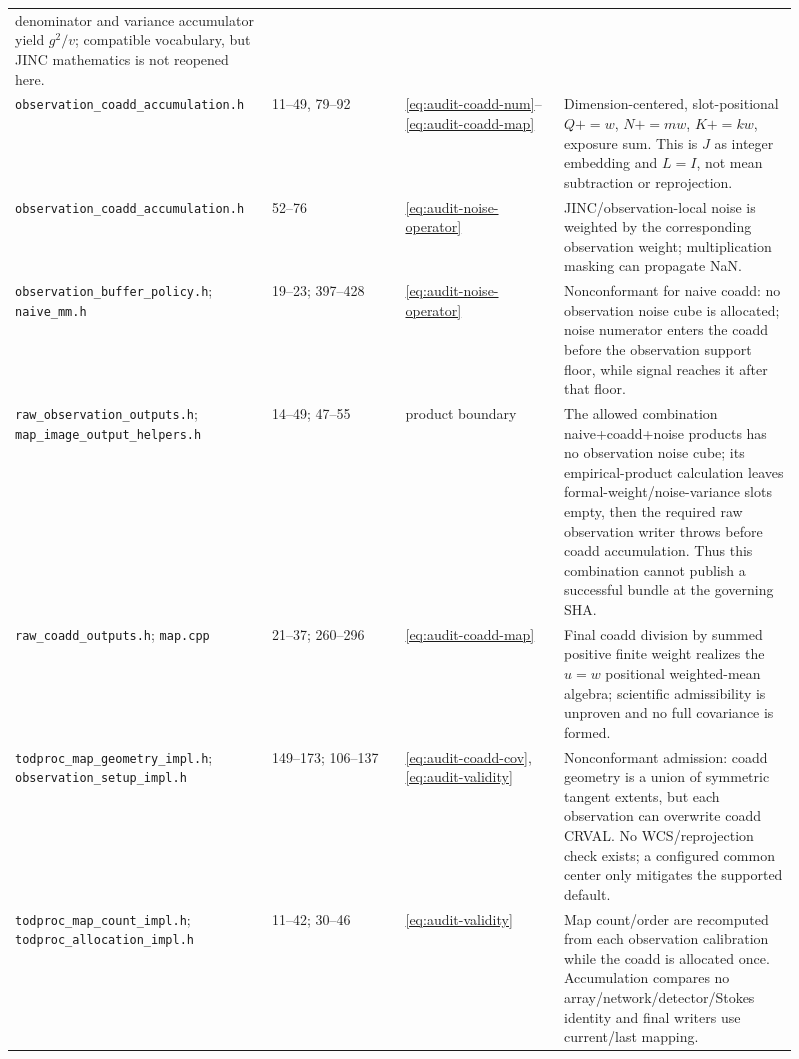 \documentclass[11pt]{article}
\newcommand{\code}[1]{\nolinkurl{#1}}
\begin{document}
\begin{longtable}{L{0.27\linewidth}L{0.16\linewidth}L{0.19\linewidth}L{0.29\linewidth}}
denominator and variance accumulator yield \(g^2/v\); compatible vocabulary,
but JINC mathematics is not reopened here.\\
\code{observation_coadd_accumulation.h} & 11--49, 79--92 &
\eqref{eq:audit-coadd-num}--\eqref{eq:audit-coadd-map} & Dimension-centered,
slot-positional \(Q{+}=w\), \(N{+}=mw\), \(K{+}=kw\), exposure sum.  This is
\(J\) as integer embedding and \(L=I\), not mean subtraction or reprojection.\\
\code{observation_coadd_accumulation.h} & 52--76 &
\eqref{eq:audit-noise-operator} & JINC/observation-local noise is weighted by
the corresponding observation weight; multiplication masking can propagate
NaN.\\
\code{observation_buffer_policy.h}; \code{naive_mm.h} & 19--23; 397--428 &
\eqref{eq:audit-noise-operator} & Nonconformant for naive coadd: no observation
noise cube is allocated; noise numerator enters the coadd before the
observation support floor, while signal reaches it after that floor.\\
\code{raw_observation_outputs.h};
\code{map_image_output_helpers.h} & 14--49; 47--55 & product boundary & The
allowed combination naive+coadd+noise products has no observation noise cube;
its empirical-product calculation leaves formal-weight/noise-variance slots
empty, then the required raw observation writer throws before coadd
accumulation.  Thus this combination cannot publish a successful bundle at the
governing SHA.\\
\code{raw_coadd_outputs.h}; \code{map.cpp} & 21--37; 260--296 &
\eqref{eq:audit-coadd-map} & Final coadd division by summed positive finite
weight realizes the \(u=w\) positional weighted-mean algebra; scientific
admissibility is unproven and no full covariance is formed.\\
\code{todproc_map_geometry_impl.h};
\code{observation_setup_impl.h} & 149--173; 106--137 &
\eqref{eq:audit-coadd-cov}, \eqref{eq:audit-validity} & Nonconformant admission:
coadd geometry is a union of symmetric tangent extents, but each observation
can overwrite coadd CRVAL.  No WCS/reprojection check exists; a configured
common center only mitigates the supported default.\\
\code{todproc_map_count_impl.h};
\code{todproc_allocation_impl.h} & 11--42; 30--46 &
\eqref{eq:audit-validity} & Map count/order are recomputed from each observation
calibration while the coadd is allocated once.  Accumulation compares no
array/network/detector/Stokes identity and final writers use current/last
mapping.\\

\end{longtable}
\end{document}
